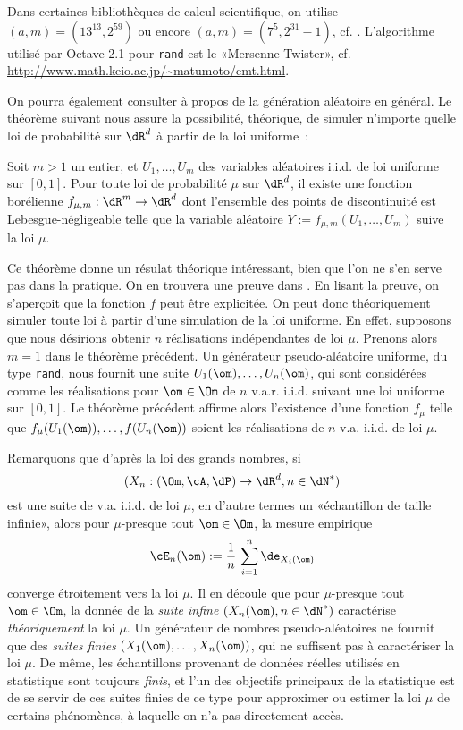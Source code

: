 Dans certaines bibliothèques de calcul
scientifique, on utilise $(a,m)=(13^{13},2^{59})$ ou encore
$(a,m)=(7^5,2^{31}-1)$, cf. \cite[page 74]{bouleau}.  L'algorithme utilisé par Octave 2.1 pour \texttt{rand} est le «Mersenne Twister», cf.
\url{http://www.math.keio.ac.jp/~matumoto/emt.html}.

On pourra également
consulter \cite{knuth-taocp-2-3} à propos de la génération aléatoire en
général. Le théorème suivant nous assure la possibilité, théorique, de simuler
n'importe quelle loi de probabilité sur $\dR^d$ à partir de la loi uniforme~:

\begin{thm}
  Soit $m>1$ un entier, et $U_1,\ldots,U_m$ des variables aléatoires i.i.d. de loi
  uniforme sur $[0,1]$. Pour toute loi de probabilité $\mu$ sur $\dR^d$, il
  existe une fonction borélienne $f_{\mu,m}:\dR^m\to\dR^d$ dont l'ensemble des
  points de discontinuité est Lebesgue-négligeable telle que la variable
  aléatoire $Y:=f_{\mu,m}(U_1,\ldots,U_m)$ suive la loi $\mu$.
\end{thm}

Ce théorème donne un résulat théorique intéressant, bien que l'on ne s'en
serve pas dans la pratique. On en trouvera une preuve dans \cite[chap. X page
267]{bouleau}. En lisant la preuve, on s'aperçoit que la fonction $f$ peut
être explicitée. On peut donc théoriquement simuler toute loi à partir d'une
simulation de la loi uniforme. En effet, supposons que nous désirions obtenir
$n$ réalisations indépendantes de loi $\mu$. Prenons alors $m=1$ dans le
théorème précédent. Un générateur pseudo-aléatoire uniforme, du type
\texttt{rand}, nous fournit une suite $U_1(\om),\ldots,U_n(\om)$, qui sont
considérées comme les réalisations pour $\om\in\Om$ de $n$ v.a.r. i.i.d. suivant
une loi uniforme sur $[0,1]$. Le théorème précédent affirme alors l'existence
d'une fonction $f_\mu$ telle que $f_\mu(U_1(\om)),\ldots,f(U_n(\om))$ soient les
réalisations de $n$ v.a. i.i.d. de loi $\mu$.

\begin{remark}
  Remarquons que d'après la loi des grands nombres, si
  $$(X_n:(\Om,\cA,\dP)\to\dR^d,n\in\dN^*)$$
  est une suite de v.a. i.i.d. de loi
  $\mu$, en d'autre termes un «échantillon de taille infinie»,
  alors pour $\mu$-presque tout $\om\in\Om$, la mesure empirique
  $$
  \cE_n(\om):=\frac{1}{n}\,\sum_{i=1}^n \de_{X_i(\om)}
  $$
  converge étroitement vers la loi $\mu$. Il en découle que pour $\mu$-presque
  tout $\om\in\Om$, la donnée de la \emph{suite infine} $(X_n(\om),n\in\dN^*)$
  caractérise \emph{théoriquement} la loi $\mu$. 
  Un générateur de nombres pseudo-aléatoires ne
  fournit que des \emph{suites finies} $(X_1(\om),\ldots,X_n(\om))$, qui ne
  suffisent pas à caractériser la loi $\mu$. De même,
  les échantillons provenant de données réelles utilisés en statistique sont 
  toujours \emph{finis}, et
  l'un des objectifs principaux de la statistique est de se servir de ces
  suites finies de ce type pour approximer ou estimer la loi $\mu$ de certains
  phénomènes, à laquelle on n'a pas directement accès.
\end{remark}

